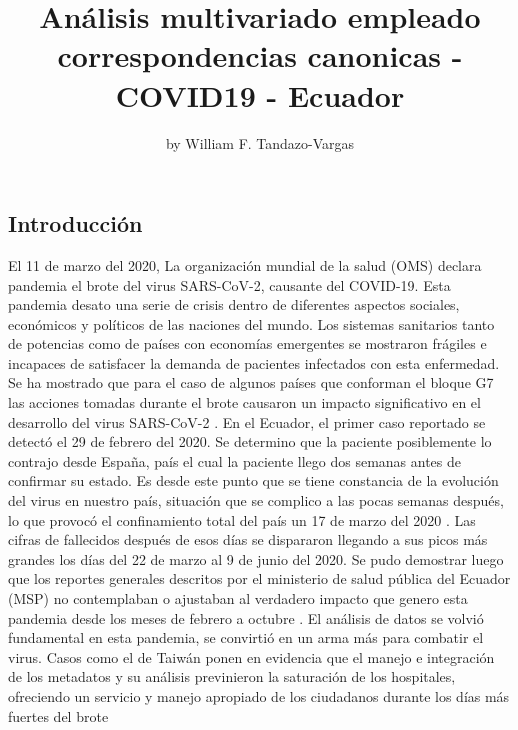 \title{Análisis multivariado empleado correspondencias canonicas -
COVID19 - Ecuador}
\author{by William F. Tandazo-Vargas}

\maketitle


\hypertarget{introducciuxf3n}{%
\subsection{Introducción}\label{introducciuxf3n}}

El 11 de marzo del 2020, La organización mundial de la salud (OMS)
declara pandemia el brote del virus SARS-CoV-2, causante del COVID-19.
Esta pandemia desato una serie de crisis dentro de diferentes aspectos
sociales, económicos y políticos de las naciones del mundo. Los sistemas
sanitarios tanto de potencias como de países con economías emergentes se
mostraron frágiles e incapaces de satisfacer la demanda de pacientes
infectados con esta enfermedad. Se ha mostrado que para el caso de
algunos países que conforman el bloque G7 las acciones tomadas durante
el brote causaron un impacto significativo en el desarrollo del virus
SARS-CoV-2 \citep{ZHANG2020109829}. En el Ecuador, el primer caso
reportado se detectó el 29 de febrero del 2020. Se determino que la
paciente posiblemente lo contrajo desde España, país el cual la paciente
llego dos semanas antes de confirmar su estado. Es desde este punto que
se tiene constancia de la evolución del virus en nuestro país, situación
que se complico a las pocas semanas después, lo que provocó el
confinamiento total del país un 17 de marzo del 2020 \citep{Haro2020}.
Las cifras de fallecidos después de esos días se dispararon llegando a
sus picos más grandes los días del 22 de marzo al 9 de junio del 2020.
Se pudo demostrar luego que los reportes generales descritos por el
ministerio de salud pública del Ecuador (MSP) no contemplaban o
ajustaban al verdadero impacto que genero esta pandemia desde los meses
de febrero a octubre \citep{CEVALLOSVALDIVIEZO2021297}. El análisis de
datos se volvió fundamental en esta pandemia, se convirtió en un arma
más para combatir el virus. Casos como el de Taiwán ponen en evidencia
que el manejo e integración de los metadatos y su análisis previnieron
la saturación de los hospitales, ofreciendo un servicio y manejo
apropiado de los ciudadanos durante los días más fuertes del brote
